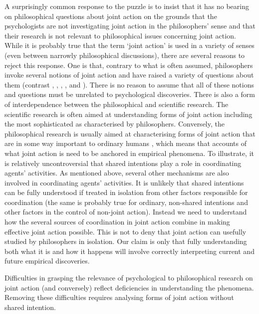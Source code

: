 \documentclass[12pt,a4paper]{extarticle}
\begin{document}
A surprisingly common response to the puzzle is to insist that it has no bearing on philosophical questions about joint action   on the grounds that the psychologists are not investigating joint action in the philosophers' sense and that their research is not relevant to philosophical issues concerning joint action.  
While it is probably true that the term `joint action' is used in a variety of senses (even between narrowly philosophical discussions), there are several reasons to reject this response.  
One is that, contrary to what is often assumed, philosophers invoke several notions of joint action and have raised a variety of questions about them (contrast
	\citealp{Bratman:2009lv},
	\citealp{Gold:2007zd},
	\citealp{miller_social_2001},
	\citealp{Pacherie:2010fk},
	and \citealp{tuomela_we-intentions_2005}%
%	
).  
There is no reason to assume that all of these notions and questions must be unrelated to  psychological discoveries.
There is also a form of interdependence between the philosophical and scientific research.
The scientific research is often aimed at understanding forms of joint action including the most sophisticated as characterised by philosophers.  
Conversely, the philosophical research is usually aimed at characterising forms of joint action that are in some way important to ordinary humans \citep[e.g.][p.\ 327]{Bratman:1992mi}, which means that accounts of what joint action is need to be anchored in empirical phenomena.
To illustrate, it is relatively uncontroversial that shared intentions play a role in coordinating agents' activities.  
As mentioned above, several other mechanisms are also involved in coordinating agents' activities.  
It is unlikely that shared intentions can be fully understood if  treated in isolation from other factors responsible for coordination (the same is probably true for ordinary, non-shared intentions and other factors in the control of non-joint action).  
Instead we need to understand how the several sources of coordination in joint action combine in making effective joint action possible.
This is not to deny that joint action can usefully studied by philosophers in isolation.  Our claim is only that fully understanding both what it is and how it happens will involve correctly interpreting current and future empirical discoveries.

Difficulties in grasping the relevance of psychological to philosophical research on joint action (and conversely) reflect deficiencies in understanding the phenomena.
Removing these difficulties requires analysing forms of joint action without shared intention.
\end{document}
